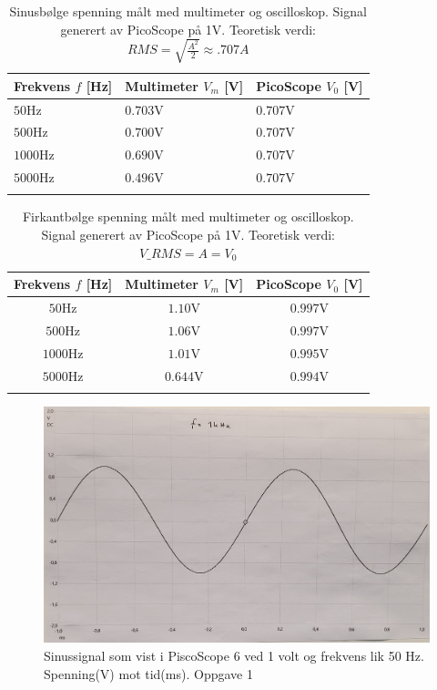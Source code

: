 \documentclass[norsk,a4paper,12pt]{article}
\begin{document}
\begin{table}[htbp]
    \centering
    \caption{Sinusbølge spenning målt med multimeter og oscilloskop. Signal generert av PicoScope på 1V. Teoretisk verdi: $RMS=\sqrt{\frac{A^{2}}{2}}\approx.707A$}
    \begin{tabular}{lll}
     \hline
     \textbf{Frekvens $f$ [Hz]} & \textbf{Multimeter $V_m$ [V]} & \textbf{PicoScope $V_0$ [V]}  \\
     \hline
     $50$Hz & $0.703$V & $0.707$V \\
     \hline
     $500$Hz & $0.700$V & $0.707$V \\
     \hline
     $1000$Hz & $0.690$V & $0.707$V \\
     \hline
     $5000$Hz & $0.496$V & $0.707$V \\
     \hline
     & 
\end{tabular}
    \label{tab:Fig1}
\end{table}

\begin{table}[htbp]
    \centering
    \caption{Firkantbølge spenning målt med multimeter og oscilloskop. Signal generert av PicoScope på 1V. Teoretisk verdi: $V\_RMS = A = V_0$ }
    \begin{tabular}{ccc}
     \hline
     \textbf{Frekvens $f$ [Hz]} & \textbf{Multimeter $V_m$ [V]} & \textbf{PicoScope $V_0$ [V]}  \\
     \hline
     $50$Hz & $1.10$V & $0.997$V \\
     \hline
     $500$Hz & $1.06$V & $0.997$V \\
     \hline
     $1000$Hz & $1.01$V & $0.995$V \\
     \hline
     $5000$Hz & $0.644$V & $0.994$V \\
     \hline
     & 
    \end{tabular}
    
    \label{tab:Fig2}
\end{table}

\begin{figure}[htbp]
    \centering
    \includegraphics[width=1\textwidth]{Figs/sinussignal.jpg}
    \caption{Sinussignal som vist i PiscoScope 6 ved 1 volt og frekvens lik 50 Hz. Spenning(V) mot tid(ms). Oppgave 1}
    \label{fig:sinwave}
\end{figure}
\end{document}
